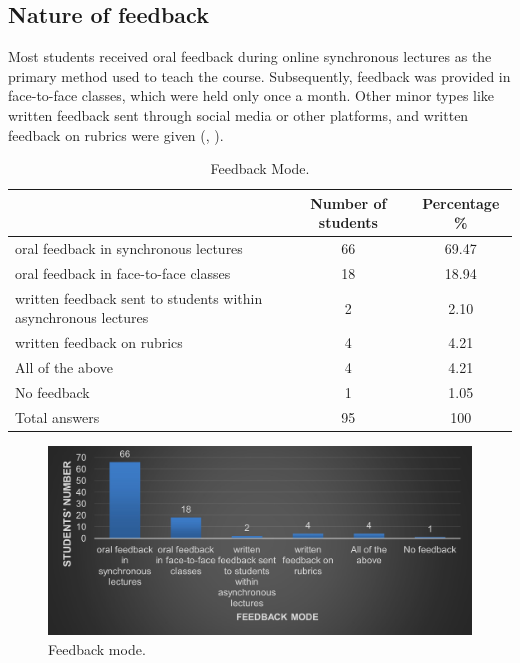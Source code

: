\documentclass[english]{textolivre}
\begin{document}
\subsection{Nature of feedback}\label{sec-fmt-manuscrito}
Most students received oral feedback during online synchronous lectures as the primary method used to teach the course. Subsequently, feedback was provided in face-to-face classes, which were held only once a month. Other minor types like written feedback sent through social media or other platforms, and written feedback on rubrics were given (, ).

\begin{table}[h!]
\centering
\begin{threeparttable}
\caption{Feedback Mode.}
\label{tbl1}
\centering
\begin{tabular}{p{} c c}
\toprule
 & Number of students & Percentage \% \\ \midrule
oral feedback in synchronous lectures & 66 & 69.47  \\ 
oral feedback in face-to-face classes & 18 & 18.94 \\
written feedback sent to students within asynchronous lectures & 2 & 2.10 \\
written feedback on rubrics & 4 & 4.21 \\
All of the above & 4 & 4.21 \\
No feedback & 1 & 1.05 \\
Total answers & 95 & 100 \\
\bottomrule
\end{tabular}
\end{threeparttable}
\end{table}

\begin{figure}[h!]
 \centering
 \begin{minipage}{.85\textwidth}
 \includegraphics[width=\textwidth]{01.jpg}
 \caption{Feedback mode.}
 \label{fig01}
 \end{minipage}
\end{figure}
\end{document}
